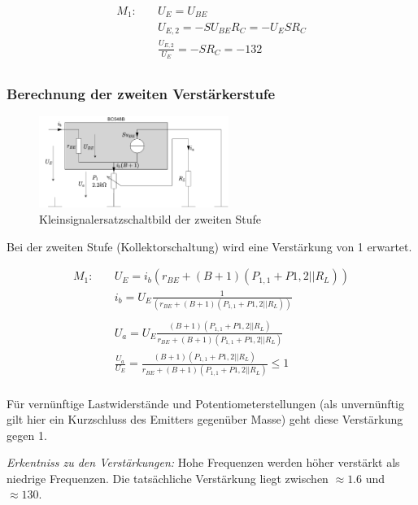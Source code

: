 \begin{align*}
    M_1:& \quad U_E = U_{BE} \\
    & \quad U_{E,2} = - S U_{BE} R_C = - U_E S R_C \\
    {} & \quad  \frac{U_{E,2}}{U_E} = - S R_C = -132 \\
\end{align*}

\subsubsection{Berechnung der zweiten Verstärkerstufe}

\begin{figure}[H]
    \centering
    \includegraphics[width = 0.55\textwidth]{tex/1_Microphone/pictures/KSESB_second_stage.pdf}
    \caption{Kleinsignalersatzschaltbild der zweiten Stufe}
    \label{fig:my_label}
\end{figure}

Bei der zweiten Stufe (Kollektorschaltung) wird eine Verstärkung von 1 erwartet.

\begin{align*}
    M_1:& \quad U_E = i_b \left( r_{BE} + (B+1) (P_{1,1} + P{1,2} || R_L) \right) \\
    & \quad i_b = U_E \frac{1}{\left( r_{BE} + (B+1) (P_{1,1} + P{1,2} || R_L) \right)} \\
    \\
    & \quad U_a =  U_E \frac{(B+1) (P_{1,1} + P{1,2} || R_L)}{r_{BE} + (B+1) (P_{1,1} + P{1,2} || R_L)} \\
    & \quad \frac{U_a}{U_E} = \frac{(B+1) (P_{1,1} + P{1,2} || R_L)}{ r_{BE} + (B+1) (P_{1,1} + P{1,2} || R_L)} \leq 1\\
\end{align*}

Für vernünftige Lastwiderstände und Potentiometerstellungen (als unvernünftig gilt hier ein Kurzschluss des Emitters gegenüber Masse) geht diese Verstärkung gegen 1.

\emph{Erkentniss zu den Verstärkungen:} Hohe Frequenzen werden höher verstärkt als niedrige Frequenzen. Die tatsächliche Verstärkung liegt zwischen $\approx 1.6$ und $\approx 130$.

